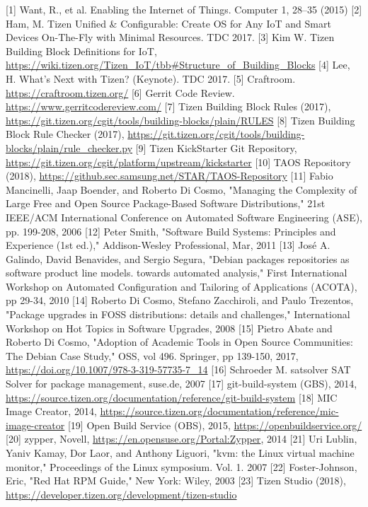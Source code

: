 [1] Want, R., et al. Enabling the Internet of Things. Computer 1, 28–35 (2015)
[2] Ham, M. Tizen Unified \& Configurable: Create OS for Any IoT and Smart Devices On-The-Fly with Minimal Resources. TDC  2017. 
[3] Kim W. Tizen Building Block Definitions for IoT, \url{https://wiki.tizen.org/Tizen_IoT/tbb#Structure_of_Building_Blocks}
[4] Lee, H. What’s Next with Tizen? (Keynote). TDC 2017.
[5] Craftroom. \url{https://craftroom.tizen.org/}
[6] Gerrit Code Review. \url{https://www.gerritcodereview.com/}
[7] Tizen Building Block Rules (2017), \url{https://git.tizen.org/cgit/tools/building-blocks/plain/RULES}
[8] Tizen Building Block Rule Checker (2017), \url{https://git.tizen.org/cgit/tools/building-blocks/plain/rule_checker.py}
[9] Tizen KickStarter Git Repository, \url{https://git.tizen.org/cgit/platform/upstream/kickstarter}
[10] TAOS Repository (2018), \url{https://github.sec.samsung.net/STAR/TAOS-Repository}
[11] Fabio Mancinelli, Jaap Boender, and Roberto Di Cosmo,  "Managing the Complexity of Large Free and Open Source Package-Based Software Distributions," 21st IEEE/ACM International Conference on Automated Software Engineering (ASE), pp. 199-208, 2006 
[12] Peter Smith, "Software Build Systems: Principles and Experience (1st ed.)," Addison-Wesley Professional, Mar, 2011
[13] José A. Galindo, David Benavides, and Sergio Segura, "Debian packages repositories as software product line models. towards automated analysis," First International Workshop on Automated Configuration and Tailoring of Applications (ACOTA), pp 29-34, 2010
[14] Roberto Di Cosmo, Stefano Zacchiroli, and Paulo Trezentos, "Package upgrades in FOSS distributions: details and challenges," International Workshop on Hot Topics in Software Upgrades, 2008
[15] Pietro Abate and Roberto Di Cosmo, "Adoption of Academic Tools in Open Source Communities: The Debian Case Study," OSS, vol 496. Springer, pp 139-150, 2017, \url{https://doi.org/10.1007/978-3-319-57735-7_14}
[16] Schroeder M. satsolver SAT Solver for package management, suse.de, 2007
[17] git-build-system (GBS), 2014, \url{https://source.tizen.org/documentation/reference/git-build-system}
[18] MIC Image Creator, 2014, \url{https://source.tizen.org/documentation/reference/mic-image-creator}
[19] Open Build Service (OBS), 2015, \url{https://openbuildservice.org/}
[20] zypper, Novell, \url{https://en.opensuse.org/Portal:Zypper}, 2014
[21] Uri Lublin, Yaniv Kamay, Dor Laor, and Anthony Liguori,  "kvm: the Linux virtual machine monitor," Proceedings of the Linux symposium. Vol. 1. 2007
[22] Foster-Johnson, Eric, "Red Hat RPM Guide," New York: Wiley, 2003
[23] Tizen Studio (2018), \url{https://developer.tizen.org/development/tizen-studio}

